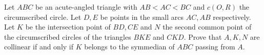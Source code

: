 Let $ABC$ be an acute-angled triangle with $AB<AC<BC$ and $c(O,R)$ the circumscribed circle. Let $D, E$ be points in the small arcs $AC, AB$ respectively. Let $K$ be the intersection point of $BD,CE$ and $N$ the second common point of the circumscribed circles of the triangles $BKE$ and $CKD$. Prove that $A, K, N$ are collinear if and only if $K$ belongs to the symmedian of $ABC$ passing from $A$.